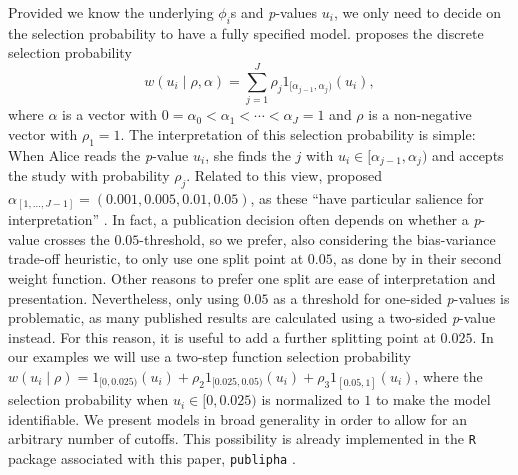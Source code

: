\documentclass[useAMS,usenatbib,referee]{biom}
\begin{document}
Provided we know the underlying $\phi_{i}$s and \textit{p}-values $u_i$, we only need to decide on the selection probability to have a fully specified model. \citet{hedges1992modeling} proposes the discrete selection probability
\begin{equation}
w(u_i\mid\rho,\alpha)=\sum_{j=1}^{J}\rho_{j}1_{[\alpha_{j-1},\alpha_{j})}(u_i),
\end{equation}
where $\alpha$ is a vector with $0=\alpha_{0}<\alpha_{1}<\cdots<\alpha_{J}=1$ and $\rho$ is a non-negative vector with $\rho_{1}=1$. The interpretation of this selection probability is simple: When Alice reads the \textit{p}-value $u_i$, she finds the $j$ with $u_i\in[\alpha_{j-1},\alpha_{j})$ and accepts the study with probability $\rho_{j}$. Related to this view, \citet{hedges1992modeling} proposed $\alpha_{[1,\dots,J-1]} = (0.001,0.005,0.01,0.05)$, as these \enquote{have particular salience for interpretation} \citep{hedges1992modeling}. In fact, a publication decision often depends on whether a \textit{p}-value crosses the $0.05$-threshold, %
so we prefer, also considering the bias-variance trade-off heuristic, to only use one split point at $0.05$, as done by \citet{iyengar1988selection} in their second weight function. Other reasons to prefer one split are ease of interpretation and presentation. Nevertheless, only using $0.05$ as a threshold for one-sided \textit{p}-values is problematic, as many published results are calculated using a two-sided \textit{p}-value instead. For this reason, it is useful to add a further splitting point at $0.025$. %
In our examples we will use a two-step function selection probability $w(u_i\mid\rho)=1_{[0,0.025)}(u_i)+\rho_{2}1_{[0.025,0.05)}(u_i)+\rho_{3}1_{\left[0.05,1\right]}(u_i)$, where the selection probability when $u_i\in[0,0.025)$ is normalized to $1$ to make the model identifiable. We present models in broad generality in order to allow for an arbitrary number of cutoffs. This possibility is already implemented in the \texttt{R} package associated with this paper, \texttt{publipha} \citep{publipha}.
\end{document}
